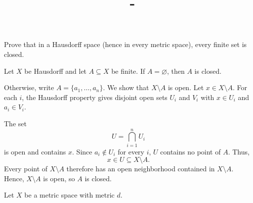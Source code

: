 \documentclass[answers,12pt,addpoints]{exam}
\author{\name}
\title{\course\ - \assignment}
\begin{document}
\maketitle

\begin{questions}

\setcounter{question}{5}
\question
Prove that in a Hausdorff space (hence in every metric space),
every finite set is closed.

\begin{solution}
Let $X$ be Hausdorff and let $A\subseteq X$ be finite.
If $A=\varnothing$, then $A$ is closed.

Otherwise, write $A=\{a_1,\ldots,a_n\}$. We show that
$X\setminus A$ is open. Let $x\in X\setminus A$.
For each $i$, the Hausdorff property gives disjoint open sets
$U_i$ and $V_i$ with $x\in U_i$ and $a_i\in V_i$.

The set
\[
U=\bigcap_{i=1}^{n}U_i
\]
is open and contains $x$. Since $a_i\notin U_i$ for every $i$,
$U$ contains no point of $A$. Thus,
\[
x\in U\subseteq X\setminus A.
\]
Every point of $X\setminus A$ therefore has an open neighborhood
contained in $X\setminus A$. Hence, $X\setminus A$ is open,
so $A$ is closed.
\end{solution}


\setcounter{question}{7}
\question
Let $X$ be a metric space with metric $d$.

\end{questions}
\end{document}
